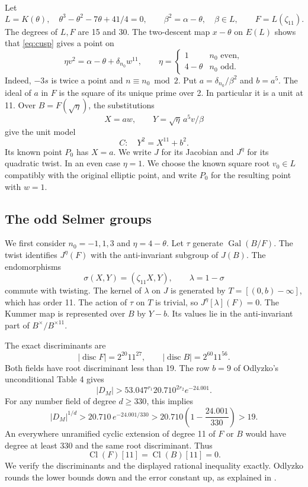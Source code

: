 \documentclass[11pt,reqno]{amsart}
\newcommand{\Cl}{\operatorname{Cl}}\newcommand{\Tr}{\operatorname{Tr}}
\theoremstyle{definition}\newtheorem{definition}[theorem]{Definition}
\theoremstyle{remark}\newtheorem{remark}[theorem]{Remark}
\numberwithin{equation}{section}
\begin{document}
Let
\[
 L=K(\theta),\quad \theta^3-\theta^2-7\theta+41/4=0,
 \qquad \beta^2=\alpha-\theta,\quad \beta\in L,
 \qquad F=L(\zeta_{11}).
\]
The degrees of \(L,F\) are 15 and 30. The two-descent map \(x-\theta\)
on \(E(L)\) shows that \eqref{eq:cusp} gives a point on
\begin{equation}\label{eq:genus5}
 \eta v^2=\alpha-\theta+\delta_{n_0}w^{11},\qquad
 \eta=\begin{cases}1&n_0\text{ even},\\4-\theta&n_0\text{ odd}.
 \end{cases}
\end{equation}
Indeed, \(-3s\) is twice a point and \(n\equiv n_0\bmod2\).
Put \(a=\delta_{n_0}/\beta^2\) and \(b=a^5\). The ideal of \(a\)
in \(F\) is the square of its unique prime over 2. In particular it
is a unit at 11. Over \(B=F(\sqrt\eta)\), the substitutions
\[
 X=aw,\qquad Y=\sqrt\eta\,a^5v/\beta
\]
give the unit model
\begin{equation}\label{eq:unit}
 C:\quad Y^2=X^{11}+b^2.
\end{equation}
Its known point \(P_0\) has \(X=a\). We write \(J\) for its Jacobian and \(J^\eta\) for its
quadratic twist. In an even case \(\eta=1\). We choose the known
square root \(v_0\in L\) compatibly with the original elliptic point,
and write \(P_0\) for the resulting point with \(w=1\).


\subsection{The odd Selmer groups}

We first consider \(n_0=-1,1,3\) and \(\eta=4-\theta\). Let
\(\tau\) generate \(\operatorname{Gal}(B/F)\). The twist identifies
\(J^\eta(F)\) with the anti-invariant subgroup of \(J(B)\).
The endomorphisms
\[
 \sigma(X,Y)=(\zeta_{11}X,Y),\qquad \lambda=1-\sigma
\]
commute with twisting. The kernel of \(\lambda\) on \(J\) is generated
by \(T=[(0,b)-\infty]\), which has order 11. The action of \(\tau\)
on \(T\) is trivial, so \(J^\eta[\lambda](F)=0\).
The Kummer map is represented over \(B\) by \(Y-b\). Its values
lie in the anti-invariant part of \(B^\times/B^{\times11}\).

The exact discriminants are
\[
 |\operatorname{disc}F|=2^{20}11^{27},\qquad
 |\operatorname{disc}B|=2^{60}11^{56}.
\]
Both fields have root discriminant less than 19. The row \(b=9\) of
Odlyzko's unconditional Table 4 \cite{Od} gives
\[
 |D_M|>53.047^{r_1}20.710^{2r_2}e^{-24.001}.
\]
For any number field of degree \(d\ge330\), this implies
\[
 |D_M|^{1/d}>20.710\,e^{-24.001/330}
 >20.710\left(1-\frac{24.001}{330}\right)>19.
\]
An everywhere unramified cyclic extension of degree 11 of \(F\) or
\(B\) would have degree at least 330 and the same root discriminant.
Thus
\begin{equation}\label{eq:classes}
 \Cl(F)[11]=\Cl(B)[11]=0.
\end{equation}
We verify the discriminants and the displayed rational inequality
exactly. Odlyzko rounds the lower bounds down and the error constant
up, as explained in \cite{OdDescription}.
\end{document}
